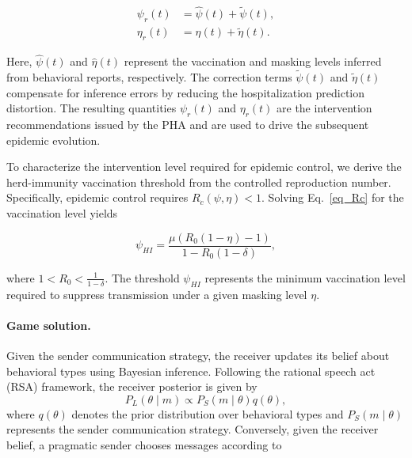 \documentclass[sigconf,review]{acmart}
\begin{document}
\begin{align}
\psi_r(t)
&=
\widehat{\psi}(t)
+
\widetilde{\psi}(t),
\\
\eta_r(t)
&=
\widehat{\eta}(t)
+
\widetilde{\eta}(t).
\label{eq:combined_params}
\end{align}

Here, $\widehat{\psi}(t)$ and $\widehat{\eta}(t)$ represent the vaccination and masking levels inferred from behavioral reports,
respectively. The correction terms
$\widetilde{\psi}(t)$ and $\widetilde{\eta}(t)$ compensate for inference errors by reducing the hospitalization prediction distortion. The
resulting quantities $\psi_r(t)$ and $\eta_r(t)$ are the intervention recommendations issued by the PHA and are used to drive the subsequent epidemic evolution.

To characterize the intervention level required for epidemic control, we derive the herd-immunity vaccination threshold from the controlled reproduction number. Specifically, epidemic control requires $R_c(\psi,\eta)<1$.
Solving Eq.~\eqref{eq_Rc} for the vaccination level yields

\begin{equation}
\psi_{HI}
=
\frac{
\mu
\left(
R_0(1-\eta)-1
\right)
}
{
1-R_0(1-\delta)
},
\label{eq:psi_HI}
\end{equation}

where $1<R_0<\frac{1}{1-\delta}$.
The threshold $\psi_{HI}$ represents the minimum vaccination level
required to suppress transmission under a given masking level $\eta$.



\paragraph{Game solution.}


Given the sender communication strategy, the receiver updates its belief about behavioral types using Bayesian inference. Following the rational speech act (RSA) framework, the receiver posterior is given by
\begin{equation} P_L(\theta\mid m) \propto P_S(m\mid\theta)q(\theta), \label{eq:rsa_listener} 
\end{equation} 
where $q(\theta)$ denotes the prior distribution over behavioral types and $P_S(m\mid\theta)$ represents the sender communication strategy. 
Conversely, given the receiver belief, a pragmatic sender chooses messages according to
\end{document}
